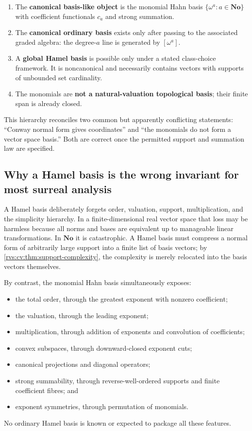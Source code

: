 \documentclass[11pt,letterpaper]{article}
\numberwithin{equation}{section}
\theoremstyle{definition}
\theoremstyle{remark}
\newcommand{\No}{\mathbf{No}}
\begin{document}
\begin{resultbox}
\begin{enumerate}[label=\textbf{\Alph*.},leftmargin=2.4em]
\item The \textbf{canonical basis-like object} is the monomial Hahn basis
$\{\omega^a:a\in\No\}$ with coefficient functionals $c_a$ and strong summation.

\item The \textbf{canonical ordinary basis} exists only after passing to the
associated graded algebra: the degree-$a$ line is generated by $[\omega^a]$.

\item A \textbf{global Hamel basis} is possible only under a stated class-choice
framework. It is noncanonical and necessarily contains vectors with supports of
unbounded set cardinality.

\item The monomials are \textbf{not a natural-valuation topological basis}; their
finite span is already closed.
\end{enumerate}
\end{resultbox}

This hierarchy reconciles two common but apparently conflicting statements:
``Conway normal form gives coordinates'' and ``the monomials do not form a vector
space basis.'' Both are correct once the permitted support and summation law are
specified.

\subsection{Why a Hamel basis is the wrong invariant for most surreal analysis}

A Hamel basis deliberately forgets order, valuation, support, multiplication,
and the simplicity hierarchy. In a finite-dimensional real vector space that loss
may be harmless because all norms and bases are equivalent up to manageable linear
transformations. In $\No$ it is catastrophic. A Hamel basis must compress a normal
form of arbitrarily large support into a finite list of basis vectors; by
\cref{rvs:cv:thm:support-complexity}, the complexity is merely relocated into the basis
vectors themselves.

By contrast, the monomial Hahn basis simultaneously exposes:
\begin{itemize}
\item the total order, through the greatest exponent with nonzero coefficient;
\item the valuation, through the leading exponent;
\item multiplication, through addition of exponents and convolution of coefficients;
\item convex subspaces, through downward-closed exponent cuts;
\item canonical projections and diagonal operators;
\item strong summability, through reverse-well-ordered supports and finite coefficient
fibres; and
\item exponent symmetries, through permutation of monomials.
\end{itemize}
No ordinary Hamel basis is known or expected to package all these features.
\end{document}
